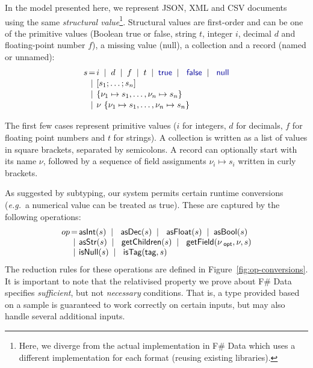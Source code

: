 \documentclass[preprint]{sigplanconf}
\newcommand{\kvd}[1]{\textnormal{\textcolor{kvdclr}{\sffamily #1}}}
\newcommand{\num}[1]{\textnormal{\textcolor{numclr}{\sffamily #1}}}
\newcommand{\ident}[1]{\textnormal{\sffamily #1}}
\newcommand{\lsep}[0]{\;\; | \;\;}
\newcommand{\narrow}[1]{\hspace{-0.85em} #1 \hspace{-0.85em}}
\begin{document}
In the model presented here, we represent JSON, XML and CSV documents using the same 
\emph{structural value}\footnote{Here, we diverge from the actual implementation in F\# Data which 
uses a different implementation for each format (reusing existing libraries).}. Structural values are 
first-order and can be one of the primitive values (Boolean \kvd{true} or \kvd{false}, string $t$, 
integer $i$, decimal $d$ and floating-point number $f$), a missing value (\kvd{null}), a collection 
and a record (named or unnamed):
%
\begin{equation*}
\begin{array}{lcl}
 s  &\narrow{=}& i \lsep d \lsep f \lsep t \lsep \kvd{true} \lsep \kvd{false} \lsep \kvd{null} \\[0.1em]
    &\narrow{|}& [s_1; \ldots; s_n] \\[0.1em]
    &\narrow{|}& \{ \nu_1 \mapsto s_1, \ldots, \nu_n \mapsto s_n \}\\[0.1em]
    &\narrow{|}& \nu~\{ \nu_1 \mapsto s_1, \ldots, \nu_n \mapsto s_n \} \\
\end{array}
\end{equation*}

\noindent
The first few cases represent primitive values ($i$ for integers, $d$ for decimals, $f$ for floating
point numbers and $t$ for strings). A collection is written as a list of values in square brackets, 
separated by semicolons. A record can optionally start with its name $\nu$, followed by a sequence of 
field assignments $\nu_i \mapsto s_i$ written in curly brackets.

As suggested by subtyping, our system permits certain runtime conversions (\emph{e.g.}~a numerical 
value \num{1} can be treated as \kvd{true}). These are captured by the following operations:
%
\begin{equation*}
\begin{array}{lcl}
 op &\narrow{=}& \ident{asInt}(s) \lsep \ident{asDec}(s) \lsep \ident{asFloat}(s) \lsep \ident{asBool}(s)  \\
    &\narrow{|}& \ident{asStr}(s) \lsep \ident{getChildren}(s) \lsep \ident{getField}(\nu_{\ident{opt}}, \nu, s)\\
    &\narrow{|}& \ident{isNull}(s) \lsep \ident{isTag}(\ident{tag}, s)
\end{array}
\end{equation*}
%
The reduction rules for these operations are defined in Figure~\ref{fig:op-conversions}. It is important
to note that the relativised property we prove about F\# Data specifies \emph{sufficient}, but
not \emph{necessary} conditions. That is, a type provided based on a sample is guaranteed to work 
correctly on certain inputs, but may also handle several additional inputs.
\end{document}
